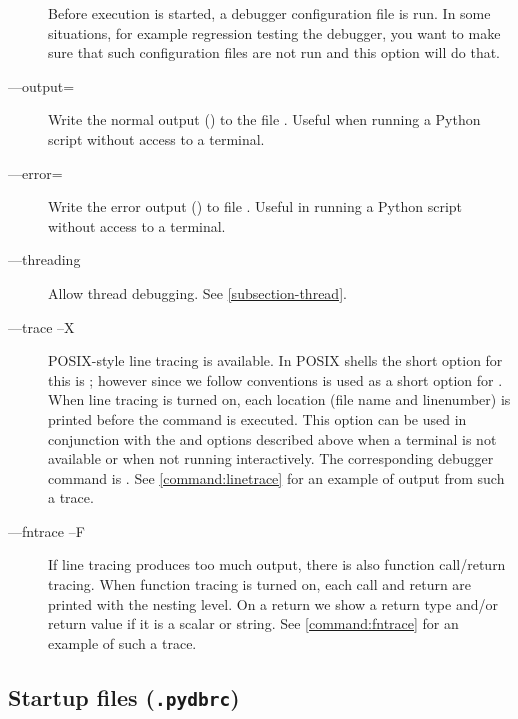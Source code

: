 \begin{description}
Before execution is started, a debugger configuration file
 is run. In some situations, for example regression
testing the debugger, you want to make sure that such configuration
files are not run and this option will do that.

\item[--{}--output=\var{filename}]

Write the normal output () to the file
. Useful when running a Python script without access to
a terminal.

\item[--{}--error=\var{filename}]

Write the error output
() to file . Useful in
 running a Python script without access to a terminal.

\item[--{}--threading]\label{switch:threading}
Allow thread debugging. See \ref{subsection-thread}.

\item[--{}--trace \code{\Large{|}}--X]\label{switch:trace}

POSIX-style line tracing is available. In POSIX shells the short
option for this is ; however since we follow 
conventions  is used as a short option for
. When line tracing is turned on, each location (file
name and linenumber) is printed before the command is executed. This
option can be used in conjunction with the  and
 options described above when a terminal is not
available or when not running interactively. The corresponding
debugger command is . See
\ref{command:linetrace} for an example of output from such a trace.

\item[--{}--fntrace \code{\Large{|}}--F]\label{switch:fntrace}

If line tracing produces too much output, there is also function
call/return tracing. When function tracing is turned on, each call and
return are printed with the nesting level. On a return we show a
return type and/or return value if it is a scalar or string.
See \ref{command:fntrace} for an example of such a trace.
\end{description}

\subsection{Startup files ({\tt .pydbrc})\label{subsection-startup-files}}


